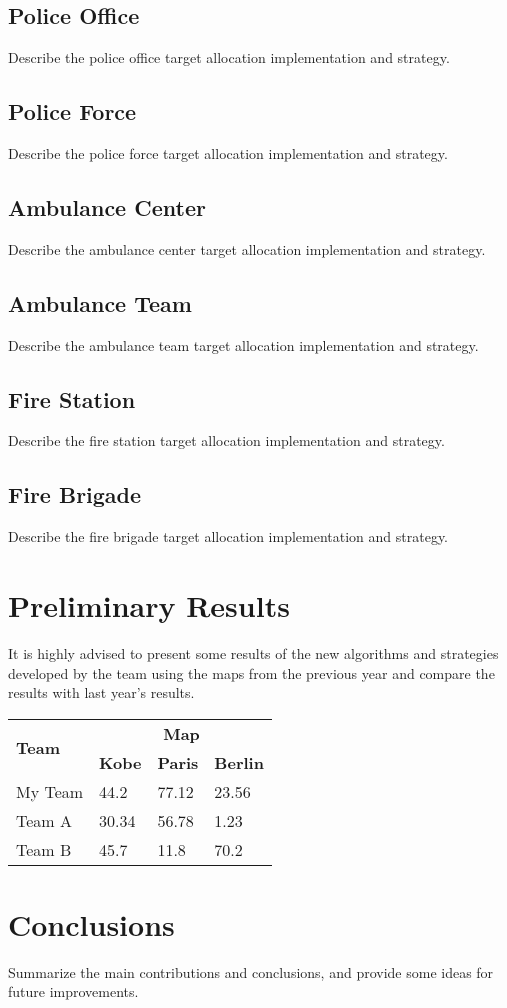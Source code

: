 \documentclass[runningheads,a4paper]{../llncs}
\begin{document}
\subsection{Police Office}
Describe the police office target allocation implementation and strategy.
\subsection{Police Force}
Describe the police force target allocation implementation and strategy.
\subsection{Ambulance Center}
Describe the ambulance center target allocation implementation and strategy.
\subsection{Ambulance Team}
Describe the ambulance team target allocation implementation and strategy.
\subsection{Fire Station}
Describe the fire station target allocation implementation and strategy.
\subsection{Fire Brigade}
Describe the fire brigade target allocation implementation and strategy.
\section{Preliminary Results}
It is highly advised to present some results of the new algorithms and
strategies developed by the team using the maps from the previous year and
compare the results with last year's results.
\begin{table}
  \begin{tabular}{llll}
    \hline
    \multirow{2}{*}{\textbf{Team}}  & \multicolumn{3}{c}{\textbf{Map}}\\
    \cline{2-4}
                                    & \textbf{Kobe} & \textbf{Paris}  & \textbf{Berlin}\\
    \hline
    My Team                         & 44.2          & 77.12           & 23.56\\
    Team A                          & 30.34         & 56.78           & 1.23\\
    Team B                          & 45.7          & 11.8            & 70.2\\
    \hline
  \end{tabular}
\end{table}
\section{Conclusions}
Summarize the main contributions and conclusions, and provide some ideas for
future improvements.


\end{document}
